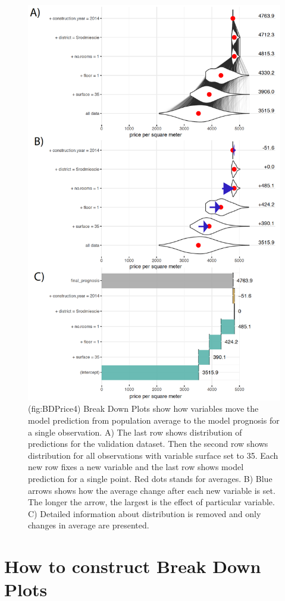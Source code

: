 \documentclass[]{book}
\theoremstyle{definition}
\theoremstyle{definition}
\theoremstyle{definition}
\theoremstyle{remark}
\begin{document}
\begin{figure}

{\centering \includegraphics[width=0.7\linewidth]{figure/bd_price_4} 

}

\caption{(fig:BDPrice4) Break Down Plots show how variables move the model prediction from population average to the model prognosis for a single observation. A) The last row shows distribution of predictions for the validation dataset. Then the second row shows distribution for all observations with variable surface set to 35. Each new row fixes a new variable and the last row shows model prediction for a single point. Red dots stands for averages. B) Blue arrows shows how the average change after each new variable is set. The longer the arrow, the largest is the effect of particular variable. C) Detailed information about distribution is removed and only changes in average are presented. }\label{fig:BDPrice4}
\end{figure}

\hypertarget{how-to-construct-break-down-plots}{%
\section{How to construct Break Down
Plots}\label{how-to-construct-break-down-plots}}
\end{document}
